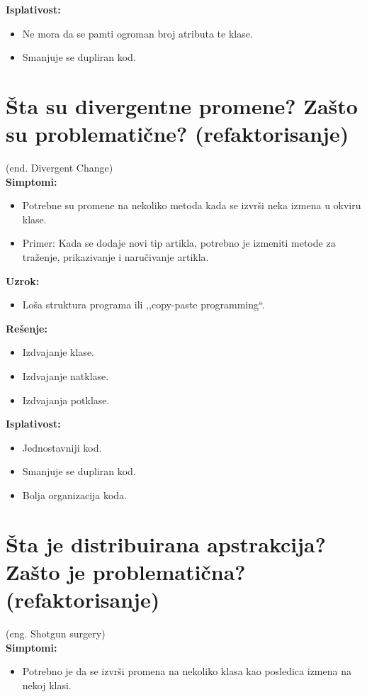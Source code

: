 \documentclass[a4paper]{article}
\begin{document}
  \noindent \textbf{Isplativost:} 
  \begin{itemize}
    \item Ne mora da se pamti ogroman broj atributa te klase.
    \item Smanjuje se dupliran kod.
  \end{itemize}

\section{Šta su divergentne promene? Zašto su problematične? (refaktorisanje)}
  (end. Divergent Change)\\
  \textbf{Simptomi:}
  \begin{itemize}
    \item Potrebne su promene na nekoliko metoda kada se izvrši neka izmena u okviru klase.
    \item Primer: Kada se dodaje novi tip artikla, potrebno je izmeniti metode za traženje,
          prikazivanje i naručivanje artikla.
  \end{itemize}

  \noindent \textbf{Uzrok:} 
  \begin{itemize}
    \item Loša struktura programa ili ,,copy-paste programming``.
  \end{itemize}

  \noindent \textbf{Rešenje:} 
  \begin{itemize}
    \item Izdvajanje klase.
    \item Izdvajanje natklase.
    \item Izdvajanja potklase.
  \end{itemize}

  \noindent \textbf{Isplativost:} 
  \begin{itemize}
    \item Jednostavniji kod.
    \item Smanjuje se dupliran kod.
    \item Bolja organizacija koda.
  \end{itemize}

\section{Šta je distribuirana apstrakcija? Zašto je problematična? (refaktorisanje)}
  (eng. Shotgun surgery)\\
  \textbf{Simptomi:}
  \begin{itemize}
    \item Potrebno je da se izvrši promena na nekoliko klasa kao posledica izmena na nekoj klasi.
  \end{itemize}
\end{document}
